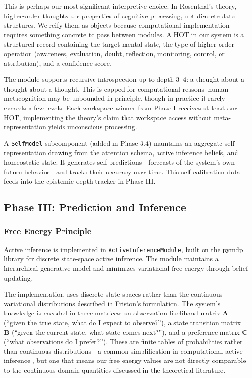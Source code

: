 This is perhaps our most significant interpretive choice. In Rosenthal's theory, higher-order thoughts are properties of cognitive processing, not discrete data structures. We reify them as objects because computational implementation requires something concrete to pass between modules. A HOT in our system is a structured record containing the target mental state, the type of higher-order operation (awareness, evaluation, doubt, reflection, monitoring, control, or attribution), and a confidence score.

The module supports recursive introspection up to depth 3--4: a thought about a thought about a thought. This is capped for computational reasons; human metacognition may be unbounded in principle, though in practice it rarely exceeds a few levels. Each workspace winner from Phase I receives at least one HOT, implementing the theory's claim that workspace access without meta-representation yields unconscious processing.

A \texttt{SelfModel} subcomponent (added in Phase 3.4) maintains an aggregate self-representation drawing from the attention schema, active inference beliefs, and homeostatic state. It generates self-predictions---forecasts of the system's own future behavior---and tracks their accuracy over time. This self-calibration data feeds into the epistemic depth tracker in Phase III.

\subsection{Phase III: Prediction and Inference}
\label{sec:fep}

\subsubsection{Free Energy Principle}

Active inference is implemented in \texttt{ActiveInferenceModule}, built on the pymdp library \cite{heins2022} for discrete state-space active inference. The module maintains a hierarchical generative model and minimizes variational free energy through belief updating.

The implementation uses discrete state spaces rather than the continuous variational distributions described in Friston's \cite{friston2010} formulation. The system's knowledge is encoded in three matrices: an observation likelihood matrix $\mathbf{A}$ (``given the true state, what do I expect to observe?''), a state transition matrix $\mathbf{B}$ (``given the current state, what state comes next?''), and a preference matrix $\mathbf{C}$ (``what observations do I prefer?''). These are finite tables of probabilities rather than continuous distributions---a common simplification in computational active inference \cite{heins2022}, but one that means our free energy values are not directly comparable to the continuous-domain quantities discussed in the theoretical literature.

